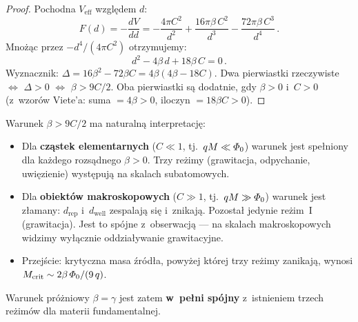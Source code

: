 \begin{proof}
Pochodna $V_{\mathrm{eff}}$ wzgl\k{e}dem $d$:
\[
  F(d) = -\frac{dV}{dd}
       = -\frac{4\pi C^2}{d^2}
         + \frac{16\pi\beta\, C^2}{d^3}
         - \frac{72\pi\beta\, C^3}{d^4}\,.
\]
Mno\.z\k{a}c przez $-d^4/(4\pi C^2)$ otrzymujemy:
\[
  d^2 - 4\beta\, d + 18\beta\, C = 0\,.
\]
Wyznacznik: $\Delta = 16\beta^2 - 72\beta C = 4\beta(4\beta - 18C)$.
Dwa pierwiastki rzeczywiste $\iff$ $\Delta > 0$ $\iff$ $\beta > 9C/2$.
Oba pierwiastki s\k{a} dodatnie, gdy $\beta > 0$ i~$C > 0$
(z~wzor\'ow Viete'a: suma $= 4\beta > 0$, iloczyn $= 18\beta C > 0$).
\end{proof}

\begin{remark}\label{rem:trzy-rezimy-fizyczne}
Warunek $\beta > 9C/2$ ma naturaln\k{a} interpretacj\k{e}:
\begin{itemize}[nosep]
  \item Dla \textbf{cz\k{a}stek elementarnych} ($C \ll 1$, tj.\
        $q M \ll \varPhi_0$) warunek jest spe\l{}niony dla ka\.zdego
        rozs\k{a}dnego $\beta > 0$. Trzy re\.zimy (grawitacja,
        odpychanie, uwi\k{e}zienie) wyst\k{e}puj\k{a} na skalach
        subatomowych.
  \item Dla \textbf{obiekt\'ow makroskopowych} ($C \gg 1$, tj.\
        $q M \gg \varPhi_0$) warunek jest z\l{}amany: $d_{\mathrm{rep}}$
        i~$d_{\mathrm{well}}$ zespalaj\k{a} si\k{e} i~znikaj\k{a}.
        Pozosta\l{} jedynie re\.zim~I (grawitacja). Jest to sp\'ojne
        z~obserwacj\k{a} --- na skalach makroskopowych widzimy wy\l{}\k{a}cznie
        oddzia\l{}ywanie grawitacyjne.
  \item Przej\'scie: krytyczna masa \'zr\'od\l{}a, powy\.zej kt\'orej
        trzy re\.zimy zanikaj\k{a}, wynosi $M_{\mathrm{crit}} \sim
        2\beta\,\varPhi_0 / (9\,q)$.
\end{itemize}
Warunek pr\'o\.zniowy $\beta = \gamma$ jest zatem \textbf{w~pe\l{}ni
sp\'ojny} z~istnieniem trzech re\.zim\'ow dla materii fundamentalnej.
\end{remark}


